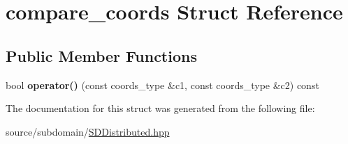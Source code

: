 \hypertarget{structcompare__coords}{}\section{compare\+\_\+coords Struct Reference}
\label{structcompare__coords}
\subsection*{Public Member Functions}
\begin{DoxyCompactItemize}
\item 
\mbox{\label{structcompare__coords_ab03ab1c46c467d5a08acd7ff2bd79de7}} 
bool {\bfseries operator()} (const coords\+\_\+type \&c1, const coords\+\_\+type \&c2) const
\end{DoxyCompactItemize}


The documentation for this struct was generated from the following file\+:\begin{DoxyCompactItemize}
\item 
source/subdomain/\mbox{\hyperlink{SDDistributed_8hpp}{S\+D\+Distributed.\+hpp}}\end{DoxyCompactItemize}
